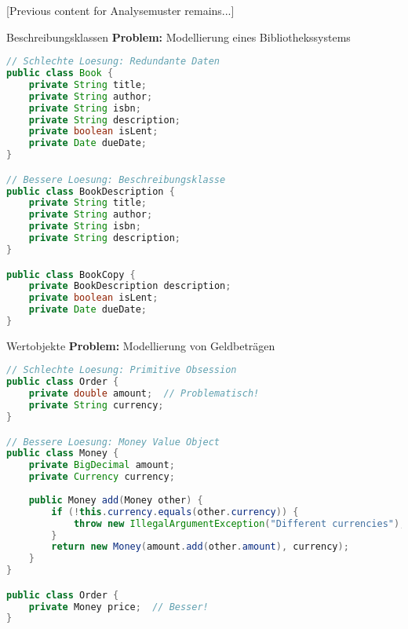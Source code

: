 [Previous content for Analysemuster remains...]

\begin{example}{Beschreibungsklassen}
\textbf{Problem:} Modellierung eines Bibliothekssystems

\begin{lstlisting}[language=Java]
// Schlechte Loesung: Redundante Daten
public class Book {
    private String title;
    private String author;
    private String isbn;
    private String description;
    private boolean isLent;
    private Date dueDate;
}

// Bessere Loesung: Beschreibungsklasse
public class BookDescription {
    private String title;
    private String author;
    private String isbn;
    private String description;
}

public class BookCopy {
    private BookDescription description;
    private boolean isLent;
    private Date dueDate;
}
\end{lstlisting}
\end{example}

\begin{example}{Wertobjekte}
\textbf{Problem:} Modellierung von Geldbeträgen

\begin{lstlisting}[language=Java]
// Schlechte Loesung: Primitive Obsession
public class Order {
    private double amount;  // Problematisch!
    private String currency;
}

// Bessere Loesung: Money Value Object
public class Money {
    private BigDecimal amount;
    private Currency currency;
    
    public Money add(Money other) {
        if (!this.currency.equals(other.currency)) {
            throw new IllegalArgumentException("Different currencies");
        }
        return new Money(amount.add(other.amount), currency);
    }
}

public class Order {
    private Money price;  // Besser!
}
\end{lstlisting}
\end{example}

